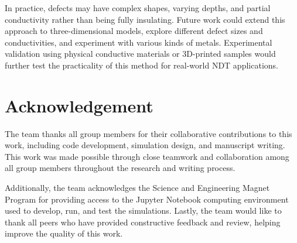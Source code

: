 \documentclass[10pt,journal,twoside]{IEEEtran} %
\begin{document}
In practice, defects may have complex shapes, varying depths, and partial conductivity rather than being fully insulating. Future work could extend this approach to three-dimensional models, explore different defect sizes and conductivities, and experiment with various kinds of metals. Experimental validation using physical conductive materials or 3D-printed samples would further test the practicality of this method for real-world NDT applications. 







\section{Acknowledgement} %

The team thanks all group members for their collaborative contributions to this work, including code development, simulation design, and manuscript writing. This work was made possible through close teamwork and collaboration among all group members throughout the research and writing process. 

Additionally, the team acknowledges the Science and Engineering Magnet Program for providing access to the Jupyter Notebook computing environment used to develop, run, and test the simulations. Lastly, the team would like to thank all peers who have provided constructive feedback and review, helping improve the quality of this work. 








\end{document}
